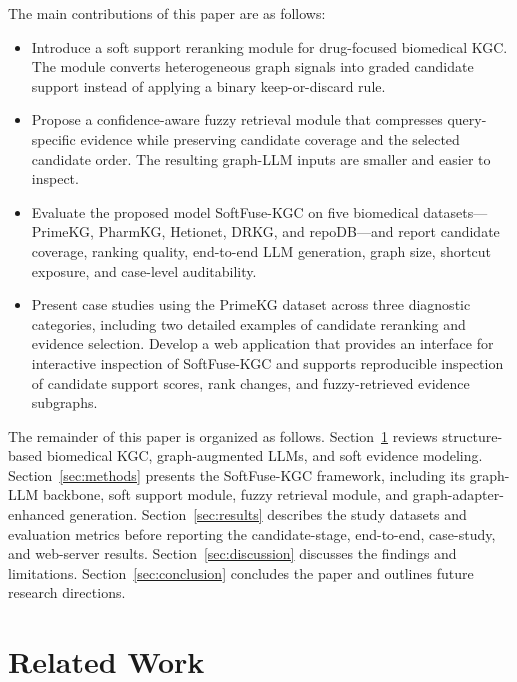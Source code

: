 \documentclass[pdflatex,sn-mathphys-num]{sn-jnl}
\newcommand{\softfuse}{SoftFuse-KGC}
\begin{document}
The main contributions of this paper are as follows:
\begin{itemize}
\item Introduce a soft support reranking module for drug-focused biomedical KGC. The module converts heterogeneous graph signals into graded candidate support instead of applying a binary keep-or-discard rule.
\item Propose a confidence-aware fuzzy retrieval module that compresses query-specific evidence while preserving candidate coverage and the selected candidate order. The resulting graph-LLM inputs are smaller and easier to inspect.
\item Evaluate the proposed model \softfuse{} on five biomedical datasets---PrimeKG, PharmKG, Hetionet, DRKG, and repoDB---and report candidate coverage, ranking quality, end-to-end LLM generation, graph size, shortcut exposure, and case-level auditability.
\item Present case studies using the PrimeKG dataset across three diagnostic categories, including two detailed examples of candidate reranking and evidence selection. Develop a web application that provides an interface for interactive inspection of \softfuse{} and supports reproducible inspection of candidate support scores, rank changes, and fuzzy-retrieved evidence subgraphs.
\end{itemize}

The remainder of this paper is organized as follows. Section~\ref{sec:related} reviews structure-based biomedical KGC, graph-augmented LLMs, and soft evidence modeling. Section~\ref{sec:methods} presents the \softfuse{} framework, including its graph-LLM backbone, soft support module, fuzzy retrieval module, and graph-adapter-enhanced generation. Section~\ref{sec:results} describes the study datasets and evaluation metrics before reporting the candidate-stage, end-to-end, case-study, and web-server results. Section~\ref{sec:discussion} discusses the findings and limitations. Section~\ref{sec:conclusion} concludes the paper and outlines future research directions.



\section{Related Work}
\label{sec:related}
\end{document}
